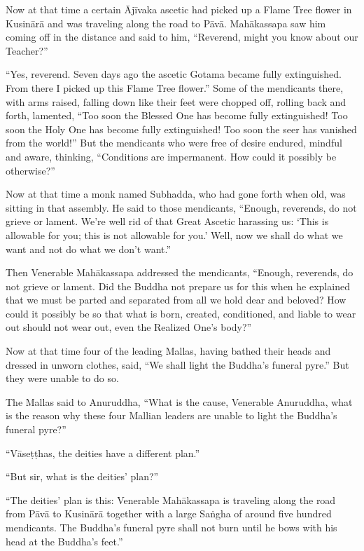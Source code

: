 \documentclass[12pt,openany]{book}%
\begin{document}
Now at that time a certain \textsanskrit{Ājīvaka} ascetic had picked up a Flame Tree flower in \textsanskrit{Kusinārā} and was traveling along the road to \textsanskrit{Pāvā}. \textsanskrit{Mahākassapa} saw him coming off in the distance and said to him, “Reverend, might you know about our Teacher?” 

“Yes, reverend. Seven days ago the ascetic Gotama became fully extinguished. From there I picked up this Flame Tree flower.” Some of the mendicants there, with arms raised, falling down like their feet were chopped off, rolling back and forth, lamented, “Too soon the Blessed One has become fully extinguished! Too soon the Holy One has become fully extinguished! Too soon the seer has vanished from the world!” But the mendicants who were free of desire endured, mindful and aware, thinking, “Conditions are impermanent. How could it possibly be otherwise?” 

Now at that time a monk named Subhadda, who had gone forth when old, was sitting in that assembly. He said to those mendicants, “Enough, reverends, do not grieve or lament. We’re well rid of that Great Ascetic harassing us: ‘This is allowable for you; this is not allowable for you.’ Well, now we shall do what we want and not do what we don’t want.” 

Then Venerable \textsanskrit{Mahākassapa} addressed the mendicants, “Enough, reverends, do not grieve or lament. Did the Buddha not prepare us for this when he explained that we must be parted and separated from all we hold dear and beloved? How could it possibly be so that what is born, created, conditioned, and liable to wear out should not wear out, even the Realized One’s body?” 

Now at that time four of the leading Mallas, having bathed their heads and dressed in unworn clothes, said, “We shall light the Buddha’s funeral pyre.” But they were unable to do so. 

The Mallas said to Anuruddha, “What is the cause, Venerable Anuruddha, what is the reason why these four Mallian leaders are unable to light the Buddha’s funeral pyre?” 

“\textsanskrit{Vāseṭṭhas}, the deities have a different plan.” 

“But sir, what is the deities’ plan?” 

“The deities’ plan is this: Venerable \textsanskrit{Mahākassapa} is traveling along the road from \textsanskrit{Pāvā} to \textsanskrit{Kusinārā} together with a large \textsanskrit{Saṅgha} of around five hundred mendicants. The Buddha’s funeral pyre shall not burn until he bows with his head at the Buddha’s feet.” 
\end{document}
